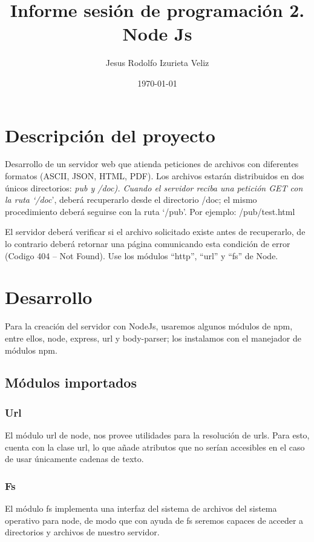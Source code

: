 \documentclass[11pt]{article}
\author{Jesus Rodolfo Izurieta Veliz}
\date{\today}
\title{Informe sesión de programación 2. Node Js}
\begin{document}
\maketitle
\tableofcontents


\section{Descripción del proyecto}
\label{sec:org9a77426}
Desarrollo de un servidor web que atienda peticiones de archivos con diferentes formatos (ASCII, JSON, HTML, PDF).
Los archivos estarán distribuidos en dos únicos directorios: \emph{pub y /doc).
Cuando el servidor reciba una petición GET con la ruta ‘/doc}', deberá recuperarlo desde el directorio /doc;
el mismo procedimiento deberá seguirse con la ruta ‘/pub'. Por ejemplo: /pub/test.html

El servidor deberá verificar si el archivo solicitado existe antes de recuperarlo,
de lo contrario deberá retornar una página comunicando esta condición de error (Codigo 404 – Not Found).
Use los módulos “http”, “url” y “fs” de Node.

\section{Desarrollo}
\label{sec:org26165d8}
Para la creación del servidor con NodeJs, usaremos algunos módulos de npm,
entre ellos, node, express, url y body-parser; los instalamos con el manejador de módulos npm.

\subsection{Módulos importados}
\label{sec:org5c55835}

\subsubsection{Url}
\label{sec:orgd33aeaa}
El módulo url de node, nos provee utilidades para la resolución de urls.
Para esto, cuenta con la clase url, lo que añade atributos que no serían accesibles en el caso de usar únicamente cadenas de texto.

\subsubsection{Fs}
\label{sec:org8ef096d}
El módulo fs implementa una interfaz del sistema de archivos del sistema operativo para node,
de modo que con ayuda de fs seremos capaces de acceder a directorios y archivos de nuestro servidor.
\end{document}
